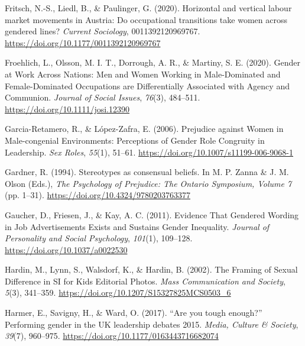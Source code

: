 \documentclass[
  12pt,
  letterpaper,
  DIV=11,
  numbers=noendperiod]{scrartcl}
\newlength{\cslhangindent}
\newlength{\cslentryspacingunit} %
\newenvironment{CSLReferences}[2] %
 {%
  \setlength{\parindent}{0pt}
  \ifodd #1
  \let\oldpar\par
  \def\par{\hangindent=\cslhangindent\oldpar}
  \fi
  \setlength{\parskip}{#2\cslentryspacingunit}
 }%
 {}
\begin{document}
\begin{CSLReferences}{1}{0}
\leavevmode{}%
Fritsch, N.-S., Liedl, B., \& Paulinger, G. (2020). Horizontal and
vertical labour market movements in {Austria}: {Do} occupational
transitions take women across gendered lines? \emph{Current Sociology},
0011392120969767. \url{https://doi.org/10.1177/0011392120969767}

\leavevmode{}%
Froehlich, L., Olsson, M. I. T., Dorrough, A. R., \& Martiny, S. E.
(2020). Gender at {Work Across Nations}: {Men} and {Women Working} in
{Male-Dominated} and {Female-Dominated Occupations} are {Differentially
Associated} with {Agency} and {Communion}. \emph{Journal of Social
Issues}, \emph{76}(3), 484--511.
\url{https://doi.org/10.1111/josi.12390}

\leavevmode{}%
Garcia-Retamero, R., \& López-Zafra, E. (2006). Prejudice against
{Women} in {Male-congenial Environments}: {Perceptions} of {Gender Role
Congruity} in {Leadership}. \emph{Sex Roles}, \emph{55}(1), 51--61.
\url{https://doi.org/10.1007/s11199-006-9068-1}

\leavevmode{}%
Gardner, R. (1994). Stereotypes as consensual beliefs. In M. P. Zanna \&
J. M. Olson (Eds.), \emph{The {Psychology} of {Prejudice}: {The Ontario
Symposium}, {Volume} 7} (pp. 1--31).
\url{https://doi.org/10.4324/9780203763377}

\leavevmode{}%
Gaucher, D., Friesen, J., \& Kay, A. C. (2011). Evidence {That Gendered
Wording} in {Job Advertisements Exists} and {Sustains Gender
Inequality}. \emph{Journal of Personality and Social Psychology},
\emph{101}(1), 109--128. \url{https://doi.org/10.1037/a0022530}

\leavevmode{}%
Hardin, M., Lynn, S., Walsdorf, K., \& Hardin, B. (2002). The {Framing}
of {Sexual Difference} in {SI} for {Kids Editorial Photos}. \emph{Mass
Communication and Society}, \emph{5}(3), 341--359.
\url{https://doi.org/10.1207/S15327825MCS0503_6}

\leavevmode{}%
Harmer, E., Savigny, H., \& Ward, O. (2017). {``{Are} you tough
enough?''} {Performing} gender in the {UK} leadership debates 2015.
\emph{Media, Culture \& Society}, \emph{39}(7), 960--975.
\url{https://doi.org/10.1177/0163443716682074}


\end{CSLReferences}
\end{document}
